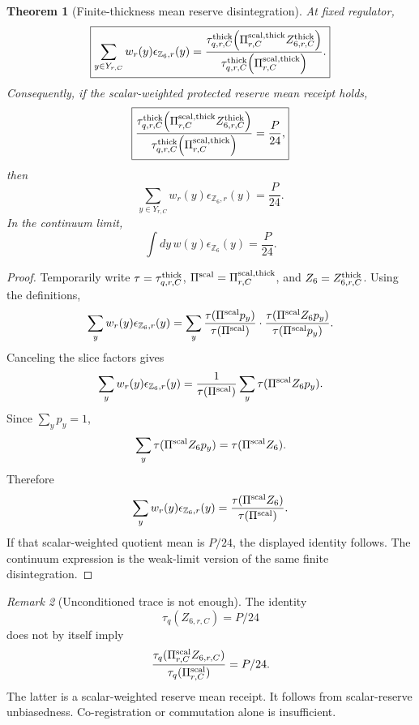 \documentclass[11pt]{article}
\newtheorem{theorem}{Theorem}[section]
\theoremstyle{remark}
\newtheorem{remark}[theorem]{Remark}
\theoremstyle{plain}
\begin{document}
\begin{theorem}[Finite-thickness mean reserve disintegration]
\label{thm:finite-thickness-mean-reserve}
At fixed regulator,
\[
\boxed{
\sum_{y\in Y_{r,C}}w_r(y)\epsilon_{\mathbb Z_6,r}(y)
=
\frac{
\tau^{\rm thick}_{q,r,C}
\!\left(\Pi^{\rm scal,thick}_{r,C}Z^{\rm thick}_{6,r,C}\right)
}{
\tau^{\rm thick}_{q,r,C}
\!\left(\Pi^{\rm scal,thick}_{r,C}\right)
}.
}
\]
Consequently, if the scalar-weighted protected reserve mean receipt holds,
\[
\boxed{
\frac{
\tau^{\rm thick}_{q,r,C}
\!\left(\Pi^{\rm scal,thick}_{r,C}Z^{\rm thick}_{6,r,C}\right)
}{
\tau^{\rm thick}_{q,r,C}
\!\left(\Pi^{\rm scal,thick}_{r,C}\right)
}
=
\frac{P}{24},
}
\]
then
\[
\boxed{
\sum_{y\in Y_{r,C}}w_r(y)\epsilon_{\mathbb Z_6,r}(y)=\frac{P}{24}.
}
\]
In the continuum limit,
\[
\boxed{
\int dy\,w(y)\epsilon_{\mathbb Z_6}(y)=\frac{P}{24}.
}
\]
\end{theorem}

\begin{proof}
Temporarily write \(\tau=\tau^{\rm thick}_{q,r,C}\),
\(\Pi^{\rm scal}=\Pi^{\rm scal,thick}_{r,C}\), and
\(Z_6=Z^{\rm thick}_{6,r,C}\). Using the definitions,
\[
\sum_y w_r(y)\epsilon_{\mathbb Z_6,r}(y)
=
\sum_y
\frac{\tau(\Pi^{\rm scal}p_y)}{\tau(\Pi^{\rm scal})}
\cdot
\frac{\tau(\Pi^{\rm scal}Z_6p_y)}{\tau(\Pi^{\rm scal}p_y)}.
\]
Canceling the slice factors gives
\[
\sum_y w_r(y)\epsilon_{\mathbb Z_6,r}(y)
=
\frac{1}{\tau(\Pi^{\rm scal})}
\sum_y\tau(\Pi^{\rm scal}Z_6p_y).
\]
Since \(\sum_y p_y=1\),
\[
\sum_y\tau(\Pi^{\rm scal}Z_6p_y)
=
\tau(\Pi^{\rm scal}Z_6).
\]
Therefore
\[
\sum_y w_r(y)\epsilon_{\mathbb Z_6,r}(y)
=
\frac{\tau(\Pi^{\rm scal}Z_6)}{\tau(\Pi^{\rm scal})}.
\]
If that scalar-weighted quotient mean is \(P/24\), the displayed identity
follows. The continuum expression is the weak-limit version of the same finite
disintegration.
\end{proof}

\begin{remark}[Unconditioned trace is not enough]
\label{rem:unconditioned-trace-not-enough}
The identity
\[
\tau_q(Z_{6,r,C})=P/24
\]
does not by itself imply
\[
\frac{\tau_q(\Pi^{\rm scal}_{r,C}Z_{6,r,C})}
{\tau_q(\Pi^{\rm scal}_{r,C})}
=
P/24.
\]
The latter is a scalar-weighted reserve mean receipt. It follows from
scalar-reserve unbiasedness. Co-registration or commutation alone is
insufficient.
\end{remark}
\end{document}

